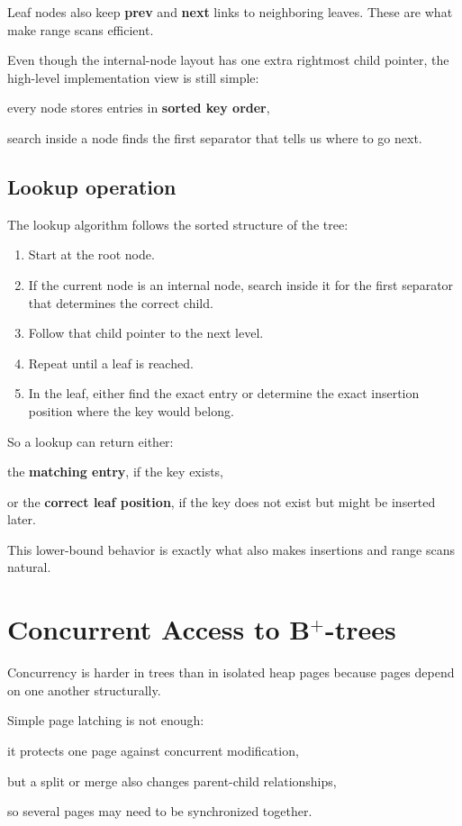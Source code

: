 \documentclass[../../dis.tex]{subfiles}
\begin{document}
Leaf nodes also keep \textbf{prev} and \textbf{next} links to neighboring leaves. These are what make range scans efficient.

Even though the internal-node layout has one extra rightmost child pointer, the high-level implementation view is still simple:
\begin{dashlist}
    \item every node stores entries in \textbf{sorted key order},
    \item search inside a node finds the first separator that tells us where to go next.
\end{dashlist}

\subsection{Lookup operation}
The lookup algorithm follows the sorted structure of the tree:
\begin{enumerate}
    \item Start at the root node.
    \item If the current node is an internal node, search inside it for the first separator that determines the correct child.
    \item Follow that child pointer to the next level.
    \item Repeat until a leaf is reached.
    \item In the leaf, either find the exact entry or determine the exact insertion position where the key would belong.
\end{enumerate}

So a lookup can return either:
\begin{dashlist}
    \item the \textbf{matching entry}, if the key exists,
    \item or the \textbf{correct leaf position}, if the key does not exist but might be inserted later.
\end{dashlist}

This lower-bound behavior is exactly what also makes insertions and range scans natural.

\section{Concurrent Access to B\texorpdfstring{$^+$}{+}-trees}
Concurrency is harder in trees than in isolated heap pages because pages depend on one another structurally.

Simple page latching is not enough:
\begin{dashlist}
    \item it protects one page against concurrent modification,
    \item but a split or merge also changes parent-child relationships,
    \item so several pages may need to be synchronized together.
\end{dashlist}
\end{document}
